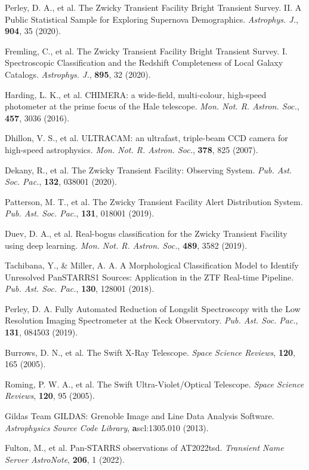 \documentclass{nature_plusfigure}
\newcommand{\mn}{{Mon. Not. R. Astron. Soc.}}
\newcommand{\mnras}{\mn}
\newcommand{\apj}{{Astrophys. J.}}
\newcommand{\pasp}{{Pub. Ast. Soc. Pac.}}
\newcommand{\ssr}{Space Science Reviews}
\begin{document}
\begin{methods}
\begin{thebibliography}{10}
 Perley, D. A., et al. The Zwicky Transient Facility Bright Transient Survey. II. A Public Statistical Sample for Exploring Supernova Demographics. \emph{\apj}, \textbf{904}, 35 (2020). 

 Fremling, C., et al. The Zwicky Transient Facility Bright Transient Survey. I. Spectroscopic Classification and the Redshift Completeness of Local Galaxy Catalogs. \emph{\apj}, \textbf{895}, 32 (2020).

 Harding, L. K., et al. CHIMERA: a wide-field, multi-colour, high-speed photometer at the prime focus of the Hale telescope. \emph{\mnras}, \textbf{457}, 3036 (2016). 

 Dhillon, V. S., et al. ULTRACAM: an ultrafast, triple-beam CCD camera for high-speed astrophysics. \emph{\mnras}, \textbf{378}, 825 (2007). 

  Dekany, R., et al. The Zwicky Transient Facility: Observing System. \emph{\pasp}, \textbf{132}, 038001 (2020). 

 Patterson, M. T., et al. The Zwicky Transient Facility Alert Distribution System. \emph{\pasp}, \textbf{131}, 018001 (2019). 

  Duev, D. A., et al. Real-bogus classification for the Zwicky Transient Facility using deep learning. \emph{\mnras}, \textbf{489}, 3582 (2019). 

 Tachibana, Y., \& Miller, A. A. A Morphological Classification Model to Identify Unresolved PanSTARRS1 Sources: Application in the ZTF Real-time Pipeline. \emph{\pasp}, \textbf{130}, 128001 (2018). 

 Perley, D. A. Fully Automated Reduction of Longslit Spectroscopy with the Low Resolution Imaging Spectrometer at the Keck Observatory. \emph{\pasp}, \textbf{131}, 084503 (2019). 

 Burrows, D. N., et al. The Swift X-Ray Telescope. \emph{\ssr}, \textbf{120}, 165 (2005). 

 Roming, P. W. A., et al. The Swift Ultra-Violet/Optical Telescope. \emph{\ssr}, \textbf{120}, 95 (2005).

 Gildas Team GILDAS: Grenoble Image and Line Data Analysis Software. \emph{Astrophysics Source Code Library}, \textbf ascl:1305.010 (2013). 

 Fulton, M., et al. Pan-STARRS observations of AT2022tsd. \emph{Transient Name Server AstroNote}, \textbf{206}, 1 (2022). 


\end{thebibliography}
\end{methods}
\end{document}
